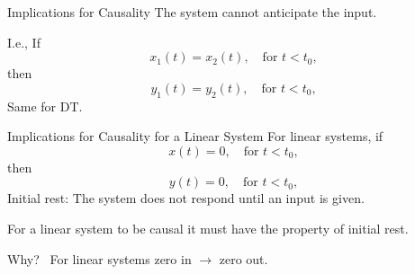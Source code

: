 \begin{frame}{Implications for Causality}
    The system cannot anticipate the input.\par
    I.e.,
    If
    \begin{equation*}
        x_1(t) = x_2(t), \quad \text{for } t < t_0,
    \end{equation*}
    then
    \begin{equation*}
        y_1(t) = y_2(t), \quad \text{for } t < t_0,
    \end{equation*}
    Same for DT.
\end{frame}

\begin{frame}{Implications for Causality for a Linear System}
    For linear systems, if
    {
    \begin{equation*}
        x(t) =0, \quad \text{for } t < t_0,
    \end{equation*}
    then
    \begin{equation*}
        y(t) =0, \quad \text{for } t < t_0,
    \end{equation*}
    }
    {
        \vspace{1.5in}
    }
    Initial rest: The system does not respond until an input is given.\par For a linear system to be causal it must have the property of initial rest.\par
    Why?\pause~ For linear systems zero in $\rightarrow$ zero out.  \par

\end{frame}

